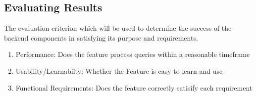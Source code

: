 \subsection{Evaluating Results}
The evaluation criterion which will be used to determine the success of the backend components in satisfying its purpose and requirements.

\begin{enumerate}
    \item Performance: Does the feature process queries within a reasonable timeframe
    \item Usability/Learnabilty: Whether the Feature is easy to learn and use
    \item Functional Requirements: Does the feature correctly satisify each requirement
\end{enumerate}